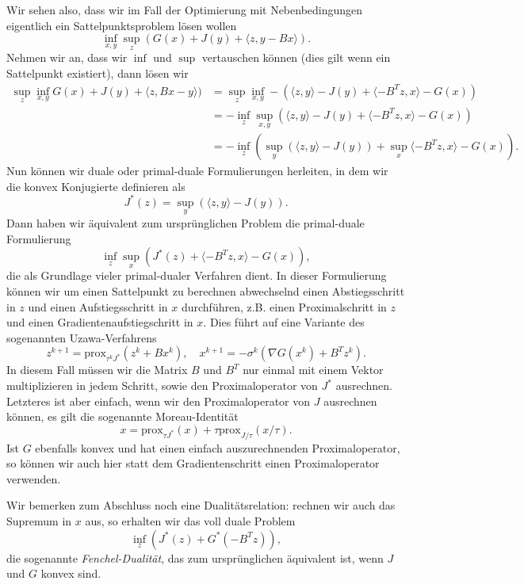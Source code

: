 Wir sehen also, dass wir im Fall der Optimierung mit Nebenbedingungen eigentlich ein Sattelpunktsproblem l\"osen wollen
$$   \inf_{x,y} \sup_z (G(x) + J(y) + \langle z, y - Bx \rangle ) . $$ 
Nehmen wir an, dass wir $\inf$ und $\sup$ vertauschen k\"onnen (dies gilt wenn ein Sattelpunkt existiert), dann l\"osen wir
\begin{align*}  \sup_z \inf_{x,y} G(x) + J(y) + \langle z, Bx - y\rangle) &= \sup_z \inf_{x,y} -(\langle z,y \rangle - J(y) +
\langle -B^Tz, x \rangle - G(x) )\\
&= - \inf_z \sup_{x,y} (\langle z,y \rangle - J(y) +
\langle -B^Tz, x \rangle - G(x) ) \\
&= - \inf_z (\sup_{y} (\langle z,y \rangle - J(y)) + \sup_x
\langle -B^Tz, x \rangle - G(x) ) .
\end{align*}
Nun k\"onnen wir duale oder primal-duale Formulierungen herleiten, in dem wir die konvex Konjugierte definieren als
$$ J^*(z) = \sup_{y} (\langle z,y \rangle - J(y)). $$
Dann haben wir \"aquivalent zum urspr\"unglichen Problem die primal-duale Formulierung
$$ \inf_z\sup_x ( J^*(z) + \langle -B^Tz, x \rangle - G(x) ) ,$$
die als Grundlage vieler primal-dualer Verfahren dient. In dieser Formulierung k\"onnen wir um einen Sattelpunkt zu berechnen abwechselnd einen Abstiegsschritt in $z$ und einen Aufstiegsschritt in $x$ durchf\"uhren, z.B. einen Proximalschritt in $z$ und einen Gradientenaufstiegschritt in $x$. Dies f\"uhrt auf eine Variante des sogenannten Uzawa-Verfahrens
$$ z^{k+1} = \text{prox}_{\tau^k J^*}(z^k + B x^k) , \quad x^{k+1} = - \sigma^k(\nabla G(x^k) + B^T z^k) . $$
In diesem Fall m\"ussen wir die Matrix $B$ und $B^T$ nur einmal mit einem Vektor multiplizieren in jedem Schritt, sowie den Proximaloperator von $J^*$ ausrechnen. Letzteres ist aber einfach, wenn wir den Proximaloperator von $J$ ausrechnen k\"onnen, es gilt die sogenannte Moreau-Identit\"at
$$ x = \text{prox}_{\tau J^*}(x) + \tau \text{prox}_{J/\tau}(x/\tau). $$
Ist $G$ ebenfalls konvex und hat einen einfach auszurechnenden Proximaloperator, so k\"onnen wir auch hier statt dem Gradientenschritt einen Proximaloperator verwenden. 

Wir bemerken zum Abschluss noch eine Dualit\"atsrelation: rechnen wir auch das Supremum in $x$ aus, so erhalten wir das voll duale Problem
$$ \inf_z ( J^*(z) + G^*(-B^T z)),$$
die sogenannte {\em Fenchel-Dualit\"at}, das zum urspr\"unglichen \"aquivalent ist, wenn $J$ und $G$ konvex sind.  